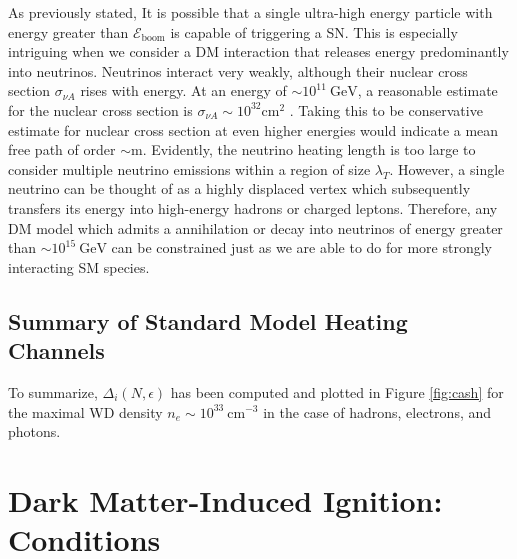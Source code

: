 \documentclass[twocolumn,showpacs,preprintnumbers,amsmath,amssymb,prd]{revtex4}
\newcommand{\Eboom}{\mathcal{E}_\text{boom}}
\newcommand{\GeV}{\text{GeV}}
\begin{document}
As previously stated, It is possible that a single ultra-high energy particle with energy greater than $\Eboom$ is capable of triggering a SN. 
This is especially intriguing when we consider a DM interaction that releases energy predominantly into neutrinos.
Neutrinos interact very weakly, although their nuclear cross section $\sigma_{\nu A}$ rises with energy.
At an energy of $\sim 10^{11} ~\GeV$, a reasonable estimate for the nuclear cross section is $\sigma_{\nu A} \sim 10^{32} \text{cm}^2$ \cite{Formaggio:2013kya}. 
Taking this to be conservative estimate for nuclear cross section at even higher energies would indicate a mean free path of order $\sim \text{m}$.
Evidently, the neutrino heating length is too large to consider multiple neutrino emissions within a region of size $\lambda_T$.
However, a single neutrino can be thought of as a highly displaced vertex which subsequently transfers its energy into high-energy hadrons or charged leptons.
Therefore, any DM model which admits a annihilation or decay into neutrinos of energy greater than $\sim 10^{15} ~\text{GeV}$ can be constrained just as we are able to do for more strongly interacting SM species.

\subsection{Summary of Standard Model Heating Channels}

To summarize, $\Delta_i(N,\epsilon)$ has been computed and plotted in Figure \ref{fig:cash} for the maximal WD density $n_e \sim 10^{33} ~\text{cm}^{-3}$ in the case of hadrons, electrons, and photons.

\section{Dark Matter-Induced Ignition: Conditions}
\label{sec:DMexplode}
\end{document}
